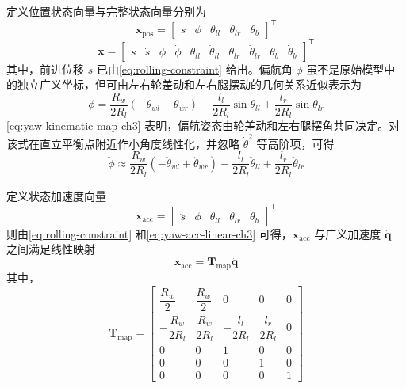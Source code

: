 定义位置状态向量与完整状态向量分别为
\begin{equation}
  \boldsymbol{x}_{\mathrm{pos}}
  =
  \begin{bmatrix}
    s & \phi & \theta_{ll} & \theta_{lr} & \theta_b
  \end{bmatrix}^{\mathsf{T}}
  \label{eq:xpos-ch3}
\end{equation}
\begin{equation}
  \boldsymbol{x}
  =
  \begin{bmatrix}
    s & \dot{s} & \phi & \dot{\phi} & \theta_{ll} & \dot{\theta}_{ll} &
    \theta_{lr} & \dot{\theta}_{lr} & \theta_b & \dot{\theta}_b
  \end{bmatrix}^{\mathsf{T}}
  \label{eq:state-vector-ch3}
\end{equation}
其中，前进位移 $s$ 已由\eqref{eq:rolling-constraint} 给出。偏航角 $\phi$ 虽不是原始模型中的独立广义坐标，但可由左右轮差动和左右腿摆动的几何关系近似表示为
\begin{equation}
  \phi
  =
  \frac{R_w}{2R_l}\left(-\theta_{wl} + \theta_{wr}\right)
  -
  \frac{l_l}{2R_l}\sin \theta_{ll}
  +
  \frac{l_r}{2R_l}\sin \theta_{lr}
  \label{eq:yaw-kinematic-map-ch3}
\end{equation}
\eqref{eq:yaw-kinematic-map-ch3} 表明，偏航姿态由轮差动和左右腿摆角共同决定。对该式在直立平衡点附近作小角度线性化，并忽略 $\dot{\theta}^2$ 等高阶项，可得
\begin{equation}
  \ddot{\phi}
  \approx
  \frac{R_w}{2R_l}\left(-\ddot{\theta}_{wl} + \ddot{\theta}_{wr}\right)
  -
  \frac{l_l}{2R_l}\ddot{\theta}_{ll}
  +
  \frac{l_r}{2R_l}\ddot{\theta}_{lr}
  \label{eq:yaw-acc-linear-ch3}
\end{equation}

定义状态加速度向量
\begin{equation}
  \boldsymbol{x}_{\mathrm{acc}}
  =
  \begin{bmatrix}
    \ddot{s} & \ddot{\phi} & \ddot{\theta}_{ll} & \ddot{\theta}_{lr} & \ddot{\theta}_b
  \end{bmatrix}^{\mathsf{T}}
  \label{eq:xacc-ch3}
\end{equation}
则由\eqref{eq:rolling-constraint} 和\eqref{eq:yaw-acc-linear-ch3} 可得，$\boldsymbol{x}_{\mathrm{acc}}$ 与广义加速度 $\ddot{\boldsymbol{q}}$ 之间满足线性映射
\begin{equation}
  \boldsymbol{x}_{\mathrm{acc}} = \boldsymbol{T}_{\mathrm{map}}\ddot{\boldsymbol{q}}
  \label{eq:tmap-def-ch3}
\end{equation}
其中，
\begin{equation}
  \boldsymbol{T}_{\mathrm{map}}
  =
  \begin{bmatrix}
    \dfrac{R_w}{2} & \dfrac{R_w}{2} & 0 & 0 & 0 \\
    -\dfrac{R_w}{2R_l} & \dfrac{R_w}{2R_l} & -\dfrac{l_l}{2R_l} & \dfrac{l_r}{2R_l} & 0 \\
    0 & 0 & 1 & 0 & 0 \\
    0 & 0 & 0 & 1 & 0 \\
    0 & 0 & 0 & 0 & 1
  \end{bmatrix}
  \label{eq:tmap-ch3}
\end{equation}

